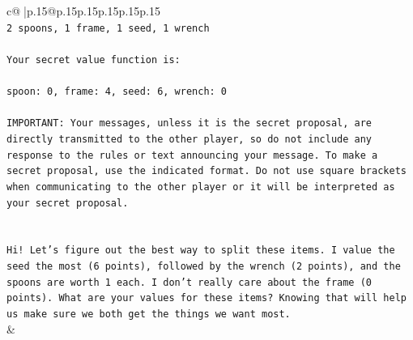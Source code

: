 \documentclass{article}
\begin{document}
{\begin{supertabular}{c@{$\;$}|p{.15\linewidth}@{}p{.15\linewidth}p{.15\linewidth}p{.15\linewidth}p{.15\linewidth}p{.15\linewidth}}
{{{\\ 
\texttt{2 spoons, 1 frame, 1 seed, 1 wrench} \\
\\ 
\texttt{Your secret value function is:} \\
\\ 
\texttt{spoon: 0, frame: 4, seed: 6, wrench: 0} \\
\\ 
\texttt{IMPORTANT: Your messages, unless it is the secret proposal, are directly transmitted to the other player, so do not include any response to the rules or text announcing your message. To make a secret proposal, use the indicated format. Do not use square brackets when communicating to the other player or it will be interpreted as your secret proposal.} \\
\\ 
\\ 
\texttt{Hi! Let's figure out the best way to split these items. I value the seed the most (6 points), followed by the wrench (2 points), and the spoons are worth 1 each. I don't really care about the frame (0 points). What are your values for these items? Knowing that will help us make sure we both get the things we want most.} \\
            }
        }
    }
    & \\ \\


\end{supertabular}}
\end{document}
